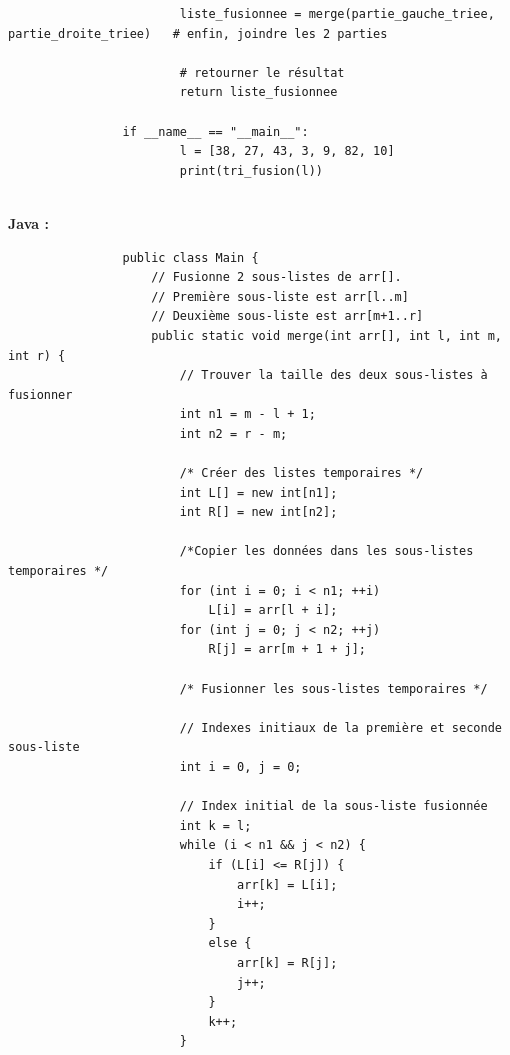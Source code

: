 \begin{Exercice} [30 minutes]
\begin{verbatim}
                        liste_fusionnee = merge(partie_gauche_triee, partie_droite_triee)   # enfin, joindre les 2 parties
                        
                        # retourner le résultat
                        return liste_fusionnee   
                
                if __name__ == "__main__":
                        l = [38, 27, 43, 3, 9, 82, 10]
                        print(tri_fusion(l))
    
            \end{verbatim}
            \textbf{Java :}
            \begin{verbatim}
                public class Main {
                    // Fusionne 2 sous-listes de arr[]. 
                    // Première sous-liste est arr[l..m] 
                    // Deuxième sous-liste est arr[m+1..r] 
                    public static void merge(int arr[], int l, int m, int r) {
                        // Trouver la taille des deux sous-listes à fusionner
                        int n1 = m - l + 1; 
                        int n2 = r - m; 
                  
                        /* Créer des listes temporaires */
                        int L[] = new int[n1]; 
                        int R[] = new int[n2]; 
                  
                        /*Copier les données dans les sous-listes temporaires */
                        for (int i = 0; i < n1; ++i) 
                            L[i] = arr[l + i]; 
                        for (int j = 0; j < n2; ++j) 
                            R[j] = arr[m + 1 + j]; 
                  
                        /* Fusionner les sous-listes temporaires */
                  
                        // Indexes initiaux de la première et seconde sous-liste
                        int i = 0, j = 0; 
                  
                        // Index initial de la sous-liste fusionnée
                        int k = l; 
                        while (i < n1 && j < n2) { 
                            if (L[i] <= R[j]) { 
                                arr[k] = L[i]; 
                                i++; 
                            } 
                            else { 
                                arr[k] = R[j]; 
                                j++; 
                            } 
                            k++; 
                        } 
                  

\end{verbatim}
\end{Exercice}
